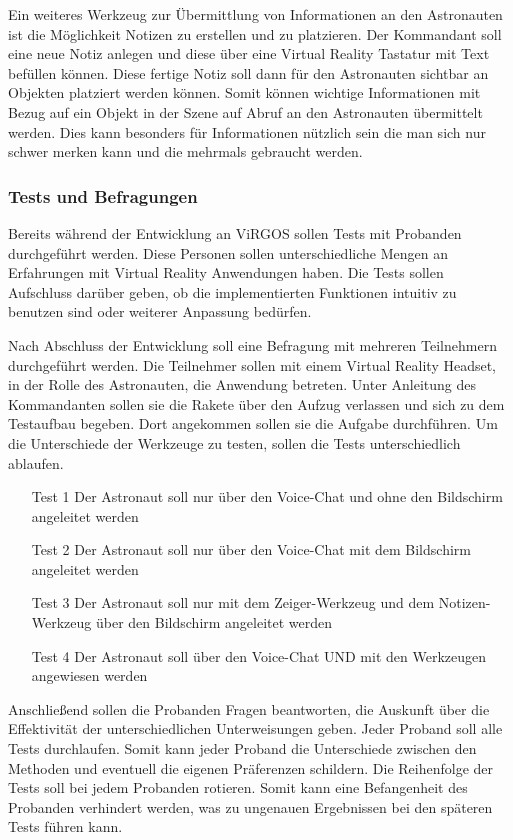 Ein weiteres Werkzeug zur Übermittlung von Informationen an den Astronauten ist die Möglichkeit Notizen zu erstellen und zu platzieren. Der Kommandant soll eine neue Notiz anlegen und diese über eine Virtual Reality Tastatur mit Text befüllen können. Diese fertige Notiz soll dann für den Astronauten sichtbar an Objekten platziert werden können. Somit können wichtige Informationen mit Bezug auf ein Objekt in der Szene auf Abruf an den Astronauten übermittelt werden. Dies kann besonders für Informationen nützlich sein die man sich nur schwer merken kann und die mehrmals gebraucht werden. 

\subsubsection{Tests und Befragungen}
Bereits während der Entwicklung an ViRGOS sollen Tests mit Probanden durchgeführt werden. Diese Personen sollen unterschiedliche Mengen an Erfahrungen mit Virtual Reality Anwendungen haben. Die Tests sollen Aufschluss darüber geben, ob die implementierten Funktionen intuitiv zu benutzen sind oder weiterer Anpassung bedürfen. 

Nach Abschluss der Entwicklung soll eine Befragung mit mehreren Teilnehmern durchgeführt werden. Die Teilnehmer sollen mit einem Virtual Reality Headset, in der Rolle des Astronauten, die Anwendung betreten. Unter Anleitung des Kommandanten sollen sie die Rakete über den Aufzug verlassen und sich zu dem Testaufbau begeben. Dort angekommen sollen sie die Aufgabe durchführen. Um die Unterschiede der Werkzeuge zu testen, sollen die Tests unterschiedlich ablaufen.

\begin{itemize}
\item[Test 1]  Der Astronaut soll nur über den Voice-Chat und ohne den Bildschirm angeleitet werden
\item[Test 2] Der Astronaut soll nur über den Voice-Chat mit dem Bildschirm angeleitet werden
\item[Test 3]  Der Astronaut soll nur mit dem Zeiger-Werkzeug und dem Notizen-Werkzeug über den Bildschirm angeleitet werden
\item[Test 4]  Der Astronaut soll über den Voice-Chat UND mit den Werkzeugen angewiesen werden
\end{itemize}

Anschließend sollen die Probanden Fragen beantworten, die Auskunft über die Effektivität der unterschiedlichen Unterweisungen geben. Jeder Proband soll alle Tests durchlaufen. Somit kann jeder Proband die Unterschiede zwischen den Methoden und eventuell die eigenen Präferenzen schildern. Die Reihenfolge der Tests soll bei jedem Probanden rotieren. Somit kann eine Befangenheit des Probanden verhindert werden, was zu ungenauen Ergebnissen bei den späteren Tests führen kann. \newline

